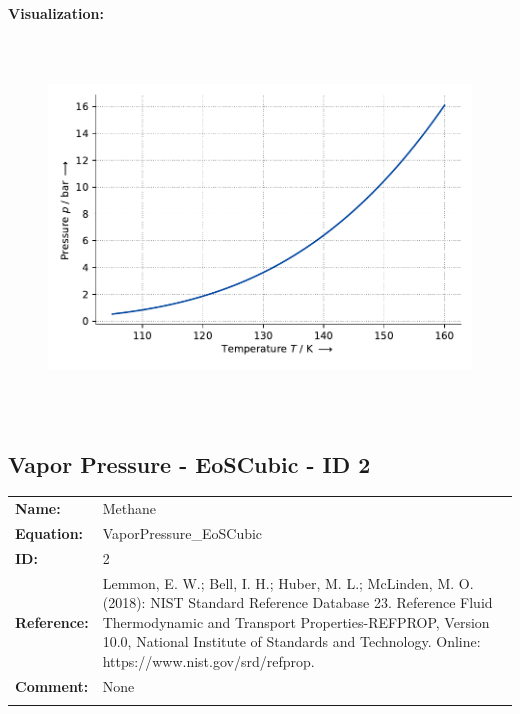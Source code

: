 \textbf{Visualization:}
%
\begin{figure}[!htp]
{\noindent\includegraphics[height=10cm, keepaspectratio]{figs/ref/ref_Methane_VaporPressure_EoSCubic_1.pdf}}
\end{figure}
%

\FloatBarrier
\newpage
\subsection{Vapor Pressure - EoSCubic - ID 2}
%
\begin{tabular}[l]{|lp{11.5cm}|}
\hline
\addlinespace

\textbf{Name:} & Methane \\
\textbf{Equation:} & VaporPressure\_EoSCubic \\
\textbf{ID:} & 2 \\
\textbf{Reference:} & Lemmon, E. W.; Bell, I. H.; Huber, M. L.; McLinden, M. O. (2018): NIST Standard Reference Database 23. Reference Fluid Thermodynamic and Transport Properties-REFPROP, Version 10.0, National Institute of Standards and Technology. Online: https://www.nist.gov/srd/refprop. \\
\textbf{Comment:} & None \\

\addlinespace
\hline
\end{tabular}
\newline

